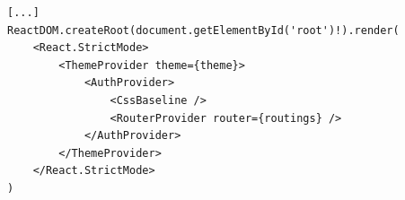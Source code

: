 \begin{lstlisting}[label=list:app_tsx,caption=Zawartość pliku App.tsx,style=JavaScriptStyle]
[...]
ReactDOM.createRoot(document.getElementById('root')!).render(
    <React.StrictMode>
        <ThemeProvider theme={theme}>
            <AuthProvider>
                <CssBaseline />
                <RouterProvider router={routings} />
            </AuthProvider>
        </ThemeProvider>
    </React.StrictMode>
)
\end{lstlisting}
